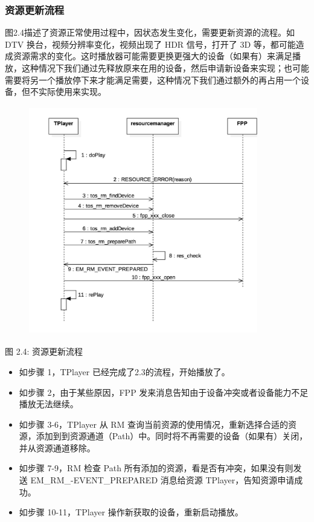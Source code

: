 \documentclass[UTF8]{ctexart}
\begin{document}
\subsubsection{资源更新流程}
图2.4描述了资源正常使用过程中，因状态发生变化，需要更新资源的流程。如 DTV 换台，视频分辨率变化，视频出现了 HDR 信号，打开了 3D 等，都可能造成资源需求的变化。这时播放器可能需要更换更强大的设备（如果有）来满足播放，这种情况下我们通过先释放原来在用的设备，然后申请新设备来实现；也可能需要将另一个播放停下来才能满足需要，这种情况下我们通过额外的再占用一个设备，但不实际使用来实现。
\begin{figure}[h]
\centering
\includegraphics[width=10cm,height=10cm]{5.png}
\end{figure}

\centerline{{图 2.4: 资源更新流程}}

\begin{itemize}
\item 如步骤 1，TPlayer 已经完成了2.3的流程，开始播放了。
\item 如步骤 2，由于某些原因，FPP 发来消息告知由于设备冲突或者设备能力不足播放无法继续。 
\item 如步骤 3-6，TPlayer 从 RM 查询当前资源的使用情况，重新选择合适的资源，添加到到资源通道（Path）中。同时将不再需要的设备（如果有）关闭，并从资源通道移除。
\item 如步骤 7-9，RM 检查 Path 所有添加的资源，看是否有冲突，如果没有则发送 EM\_RM\_-EVENT\_PREPARED 消息给资源 TPlayer，告知资源申请成功。
\item 如步骤 10-11，TPlayer 操作新获取的设备，重新启动播放。
\end{itemize}
\end{document}
